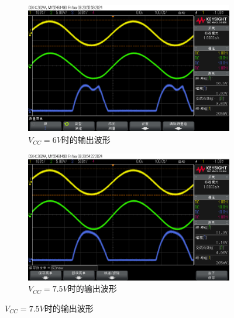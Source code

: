\documentclass[UTF8]{ctexart}
\begin{document}
\begin{figure}[H]
    \centering
    \begin{subfigure}[c]{0.45\textwidth}
        \centering
        \includegraphics[width=\textwidth]{pics/61.png}
        \caption{$V_{CC}=6V$时的输出波形}\label{fig:61}
    \end{subfigure}
    \begin{subfigure}[c]{0.45\textwidth}
        \centering
        \includegraphics[width=\textwidth]{pics/62.png}
        \caption{$V_{CC}=7.5V$时的输出波形}\label{fig:62}
    \end{subfigure}


\end{figure}
\end{document}
